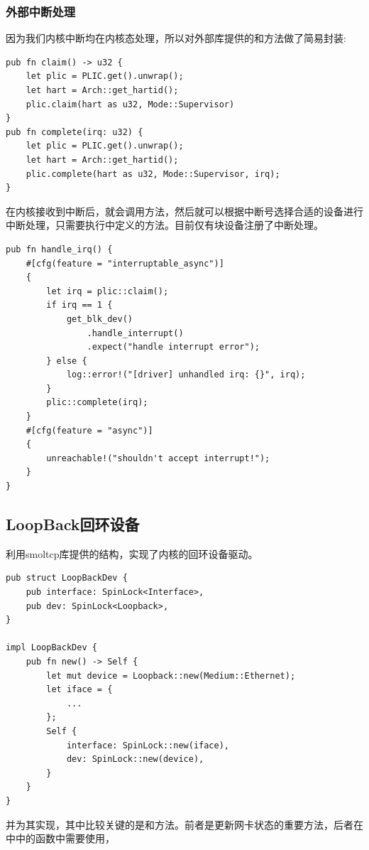 \documentclass{article}
\begin{document}
\subsubsection{外部中断处理}

因为我们内核中断均在内核态处理，所以对外部库提供的和方法做了简易封装:
\begin{lstlisting}
pub fn claim() -> u32 {
    let plic = PLIC.get().unwrap();
    let hart = Arch::get_hartid();
    plic.claim(hart as u32, Mode::Supervisor)
}
pub fn complete(irq: u32) {
    let plic = PLIC.get().unwrap();
    let hart = Arch::get_hartid();
    plic.complete(hart as u32, Mode::Supervisor, irq);
}
\end{lstlisting}

在内核接收到中断后，就会调用方法，然后就可以根据中断号选择合适的设备进行中断处理，只需要执行中定义的方法。目前仅有块设备注册了中断处理。
\begin{lstlisting}
pub fn handle_irq() {
    #[cfg(feature = "interruptable_async")]
    {
        let irq = plic::claim();
        if irq == 1 {
            get_blk_dev()
                .handle_interrupt()
                .expect("handle interrupt error");
        } else {
            log::error!("[driver] unhandled irq: {}", irq);
        }
        plic::complete(irq);
    }
    #[cfg(feature = "async")]
    {
        unreachable!("shouldn't accept interrupt!");
    }
}

\end{lstlisting}

\subsection{LoopBack回环设备}
利用smoltcp库提供的结构，实现了内核的回环设备驱动。

\begin{lstlisting}
pub struct LoopBackDev {
    pub interface: SpinLock<Interface>,
    pub dev: SpinLock<Loopback>,
}

impl LoopBackDev {
    pub fn new() -> Self {
        let mut device = Loopback::new(Medium::Ethernet);
        let iface = {
            ...
        };
        Self {
            interface: SpinLock::new(iface),
            dev: SpinLock::new(device),
        }
    }
}
\end{lstlisting}

并为其实现，其中比较关键的是和方法。前者是更新网卡状态的重要方法，后者在中中的函数中需要使用，
\end{document}
